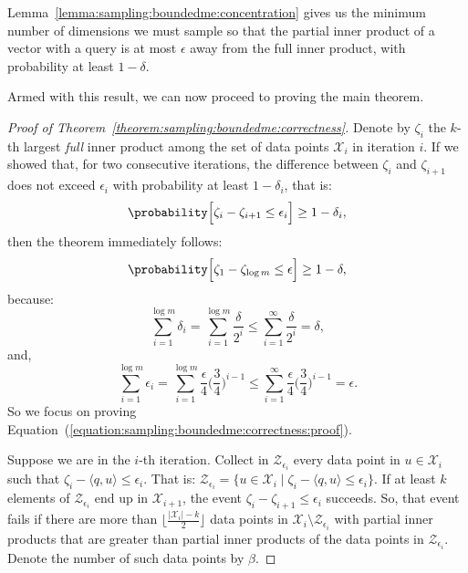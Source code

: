 \begin{svgraybox}
    Lemma~\ref{lemma:sampling:boundedme:concentration} gives us the minimum number of
    dimensions we must sample so that the partial inner product of a vector with a query
    is at most $\epsilon$ away from the full inner product, with probability at least
    $1 - \delta$.
\end{svgraybox}

Armed with this result, we can now proceed to proving the main theorem.

\begin{proof}[Proof of Theorem~\ref{theorem:sampling:boundedme:correctness}]
    Denote by $\zeta_i$ the $k$-th largest \emph{full} inner product among
    the set of data points $\mathcal{X}_i$ in iteration $i$. If we showed that,
    for two consecutive iterations, the difference between
    $\zeta_i$ and $\zeta_{i + 1}$ does not exceed $\epsilon_i$ with probability
    at least $1 - \delta_i$, that is:
    \begin{equation}
        \label{equation:sampling:boundedme:correctness:proof}
        \probability\Big[ \zeta_i - \zeta_{i + 1} \leq \epsilon_i \Big] \geq 1 - \delta_i,
    \end{equation}
    then the theorem immediately follows:
    \begin{equation*}
        \probability\Big[ \zeta_1 - \zeta_{\log m} \leq \epsilon \Big] \geq 1 - \delta,
    \end{equation*}
    because:
    \begin{equation*}
        \sum_{i = 1}^{\log m} \delta_i = \sum_{i = 1}^{\log m} \frac{\delta}{2^i} \leq \sum_{i = 1}^{\infty} \frac{\delta}{2^i} = \delta,
    \end{equation*}
    and,
    \begin{equation*}
        \sum_{i = 1}^{\log m} \epsilon_i = \sum_{i = 1}^{\log m} \frac{\epsilon}{4} \big(\frac{3}{4}\big)^{i - 1}
        \leq \sum_{i = 1}^{\infty} \frac{\epsilon}{4} \big(\frac{3}{4}\big)^{i - 1} = \epsilon.
    \end{equation*}
    So we focus on proving Equation~(\ref{equation:sampling:boundedme:correctness:proof}).

    Suppose we are in the $i$-th iteration. Collect in $\mathcal{Z}_{\epsilon_i}$
    every data point in $u \in \mathcal{X}_i$ such that $\zeta_i - \langle q, u \rangle \leq \epsilon_i$.
    That is: $\mathcal{Z}_{\epsilon_i} = \{ u \in \mathcal{X}_i \;|\; \zeta_i - \langle q, u \rangle \leq \epsilon_i \}$. If at least $k$ elements of $\mathcal{Z}_{\epsilon_i}$ end up in $\mathcal{X}_{i + 1}$,
    the event $\zeta_i - \zeta_{i + 1} \leq \epsilon_i$ succeeds. So, that event fails
    if there are more than $\lfloor \frac{\lvert \mathcal{X}_i \rvert - k}{2} \rfloor$
    data points in $\mathcal{X}_i \setminus \mathcal{Z}_{\epsilon_i}$ with partial inner products
    that are greater than partial inner products of the data points in $\mathcal{Z}_{\epsilon_i}$.
    Denote the number of such data points by $\beta$.


\end{proof}
